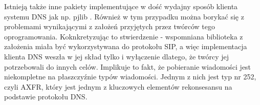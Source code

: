 Istnieją także inne pakiety implementujące w dość wydajny sposób klienta systemu DNS jak np. pjlib \cite{pjlib}. Również w tym przypadku można borykać się z problemami wynikającymi z założeń przyjętych przez twórców tego oprogramowania. Koknkretyzując to stwierdzenie - wspomniana biblioteka z założenia miała być wykorzystywana do protokołu SIP, a więc implementacja klienta DNS weszła w jej skład tylko i wyłączenie dlatego, że twórcy jej potrzebowali do innych celów. Implikuje to fakt, że pobieranie wiadomości jest niekompletne na płaszczyźnie typów wiadomości. Jednym z nich jest typ nr 252, czyli AXFR, który jest jednym z kluczowych elementów rekonsesansu na podstawie protokołu DNS.